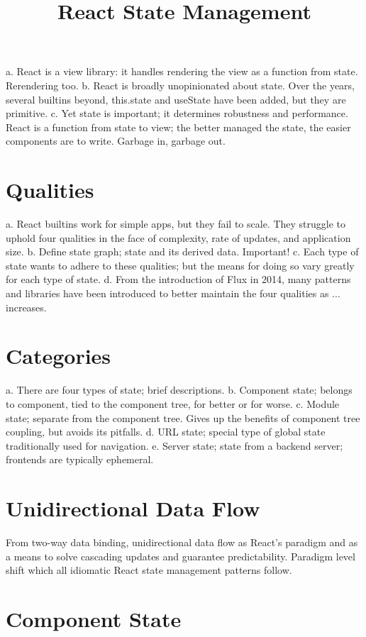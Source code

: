 \documentclass{article}
\title{React State Management}
\begin{document}
a. React is a view library: it handles rendering the view as a function from state. Rerendering too.
b. React is broadly unopinionated about state. Over the years, several builtins beyond, this.state and useState have been added, but they are primitive.
c. Yet state is important; it determines robustness and performance. React is a function from state to view; the better managed the state, the easier components are to write. Garbage in, garbage out.

\section{Qualities}

a. React builtins work for simple apps, but they fail to scale. They struggle to uphold four qualities in the face of complexity, rate of updates, and application size.
b. Define state graph; state and its derived data. Important!
c. Each type of state wants to adhere to these qualities; but the means for doing so vary greatly for each type of state.
d. From the introduction of Flux in 2014, many patterns and libraries have been introduced to better maintain the four qualities as ... increases.

\section{Categories}

a. There are four types of state; brief descriptions.
b. Component state; belongs to component, tied to the component tree, for better or for worse.
c. Module state; separate from the component tree. Gives up the benefits of component tree coupling, but avoids its pitfalls.
d. URL state; special type of global state traditionally used for navigation.
e. Server state; state from a backend server; frontends are typically ephemeral.

\section{Unidirectional Data Flow}

From two-way data binding, unidirectional data flow as React's paradigm and as a means to solve cascading updates and guarantee predictability. Paradigm level shift which all idiomatic React state management patterns follow.

\section{Component State}
\end{document}
